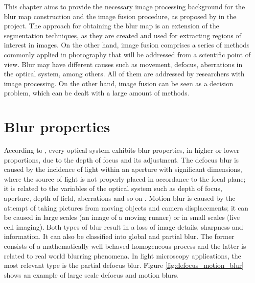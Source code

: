 

This chapter aims to provide the necessary image processing background for the blur map construction and the image fusion procedure, as proposed by in the project. The approach for obtaining the blur map is an extension of the segmentation techniques, as they are created and used for extracting regions of interest in images. On the other hand, image fusion comprises a series of methods commonly applied in photography that will be addressed from a scientific point of view. Blur may have different causes such as movement, defocus, aberrations in the optical system, among others. All of them are addressed by researchers with image processing. On the other hand, image fusion can be seen as a decision problem, which can be dealt with a large amount of methods.

\section{Blur properties}

According to , every optical system exhibits blur properties, in higher or lower proportions, due to the depth of focus and its adjustment. The defocus blur is caused by the incidence of light within an aperture with significant dimensions, where the source of light is not properly placed in accordance to the focal plane; it is related to the variables of the optical system such as depth of focus, aperture, depth of field, aberrations and so on \cite{joshi2014defocus}. Motion blur is caused by the attempt of taking pictures from moving objects and camera displacements; it can be caused in large scales (an image of a moving runner) or in small scales (live cell imaging). Both types of blur result in a loss of image details, sharpness and information. It can also be classified into global and partial blur. The former consists of a mathematically well-behaved homogeneous process and the latter is related to real world blurring phenomena. In light microscopy applications, the most relevant type is the partial defocus blur. Figure \ref{fig:defocus_motion_blur} shows an example of large scale defocus and motion blurs.

